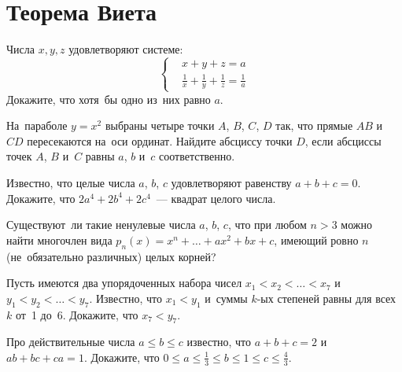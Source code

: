 
\section*{Теорема Виета}



\begin{problems}

\item
Числа $x, y, z$ удовлетворяют системе:
\[ \left\{ \begin{aligned} &
    x  + y  + z  = a
\\ &
    \frac{1}{x} + \frac{1}{y} + \frac{1}{z} = \frac{1}{a}
\end{aligned} \right. \]
Докажите, что хотя~бы одно из~них равно $a$.

\item
На~параболе $y = x^2$ выбраны четыре точки $A$, $B$, $C$, $D$ так, что прямые
$AB$ и~$CD$ пересекаются на~оси ординат.
Найдите абсциссу точки $D$, если абсциссы точек $A$, $B$ и~$C$ равны
$a$, $b$ и~$c$ соответственно.

\item
Известно, что целые числа $a$, $b$, $c$ удовлетворяют равенству
$a + b + c = 0$.
Докажите, что $2 a^4 + 2 b^4 + 2 c^4$~--- квадрат целого числа.

\item
Существуют~ли такие ненулевые числа $a$, $b$, $c$, что при любом $n > 3$ можно
найти многочлен вида $p_n(x) = x^n + \ldots + a x^2 + b x + c$, имеющий ровно
$n$ (не~обязательно различных) целых корней?


\item
Пусть имеются два упорядоченных набора чисел $x_1 < x_2 < \ldots < x_7$
и~$y_1 < y_2 < \ldots < y_7$.
Известно, что $x_1 < y_1$ и~суммы $k$-ых степеней равны для всех $k$ от~1 до~6.
Докажите, что $x_7 < y_7$.


\item
Про действительные числа $a \leq b \leq c$ известно, что $a + b + c = 2$
и~$a b + b c + c a = 1$.
Докажите, что
$0 \leq a \leq \frac{1}{3} \leq b \leq 1 \leq c \leq \frac{4}{3}$.

\end{problems}

